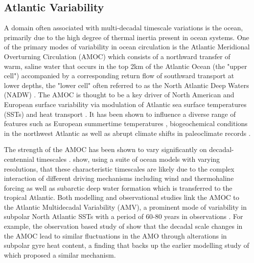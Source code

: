 \subsection{Atlantic Variability}
A domain often associated with multi-decadal timescale variations is the ocean, primarily due to the high degree of thermal inertia present in ocean systems. One of the primary modes of variability in ocean circulation is the Atlantic Meridional Overturning Circulation (AMOC) which consists of a northward transfer of warm, saline water that occurs in the top 2km of the Atlantic Ocean (the "upper cell") accompanied by a corresponding return flow of southward transport at lower depths, the "lower cell" often referred to as the North Atlantic Deep Waters (NADW) \citep{kuhlbrodtDriving2007b, xuIntraseasonal2014b, buckleyObservations2016d}. The AMOC is thought to be a key driver of North American and European surface variability via modulation of Atlantic sea surface temperatures (SSTs) and heat transport \citep{knightSignature2005b, delworthObserved2000b, friersonContribution2013b, frankignoulInfluence2013b}. It has been shown to influence a diverse range of features such as European summertime temperatures \citep{suttonAtlantic2005b}, biogeochemical conditions in the northwest Atlantic \citep{lavoieProjections2019b} as well as abrupt climate shifts in paleoclimate records \citep{alleyWally2007c, chengIce2009c}. 

The strength of the AMOC has been shown to vary significantly on decadal-centennial timescales \citep{delworthInterdecadal1993b, biastochCauses2008c, tullochExploring2012b, menaryMultimodel2012b}. \cite{biastochCauses2008c} show, using a suite of ocean models with varying resolutions, that these characteristic timescales are likely due to the complex interaction of different driving mechanisms including wind and thermohaline forcing as well as subarctic deep water formation which is transferred to the tropical Atlantic. Both modelling and observational studies link the AMOC to the Atlantic Multidecadal Variability (AMV), a prominent mode of variability in subpolar North Atlantic SSTs with a period of 60-80 years in observations \citep{zhangReview2019}. For example, the observation based study of \cite{mccarthyOcean2015} show that the decadal scale changes in the AMOC lead to similar fluctuations in the AMO through alterations in subpolar gyre heat content, a finding that backs up the earlier modelling study of \cite{delworthObserved2000b} which proposed a similar mechanism.

